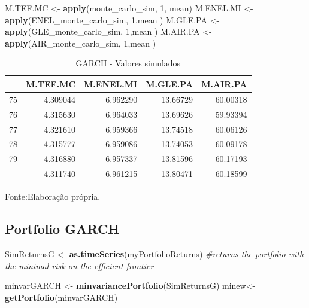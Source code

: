 \documentclass[
  12pt,
  a4paper,
  openany]{book}
\newenvironment{Shaded}{\begin{snugshade}}{\end{snugshade}}
\newcommand{\CommentTok}[1]{\textcolor[rgb]{0.56,0.35,0.01}{\textit{#1}}}
\newcommand{\DecValTok}[1]{\textcolor[rgb]{0.00,0.00,0.81}{#1}}
\newcommand{\KeywordTok}[1]{\textcolor[rgb]{0.13,0.29,0.53}{\textbf{#1}}}
\newcommand{\NormalTok}[1]{#1}
\newcommand{\StringTok}[1]{\textcolor[rgb]{0.31,0.60,0.02}{#1}}
\begin{document}
\scriptsize

\begin{Shaded}
\begin{Highlighting}[]
\NormalTok{M.TEF.MC \textless{}{-}}\StringTok{ }\KeywordTok{apply}\NormalTok{(monte\_carlo\_sim, }\DecValTok{1}\NormalTok{, mean)}
\NormalTok{M.ENEL.MI \textless{}{-}}\StringTok{ }\KeywordTok{apply}\NormalTok{(ENEL\_monte\_carlo\_sim, }\DecValTok{1}\NormalTok{,mean )}
\NormalTok{M.GLE.PA \textless{}{-}}\StringTok{ }\KeywordTok{apply}\NormalTok{(GLE\_monte\_carlo\_sim, }\DecValTok{1}\NormalTok{,mean )}
\NormalTok{M.AIR.PA \textless{}{-}}\StringTok{ }\KeywordTok{apply}\NormalTok{(AIR\_monte\_carlo\_sim, }\DecValTok{1}\NormalTok{,mean )}
\end{Highlighting}
\end{Shaded}

\normalsize
\begin{table}[!h]

\caption{\label{tab:unnamed-chunk-41}GARCH - Valores simulados}
\centering
\begin{tabular}[t]{lrrrr}
\toprule
  & M.TEF.MC & M.ENEL.MI & M.GLE.PA & M.AIR.PA\\
\midrule
75 & 4.309044 & 6.962290 & 13.66729 & 60.00318\\
76 & 4.315630 & 6.964033 & 13.69626 & 59.93394\\
77 & 4.321610 & 6.959366 & 13.74518 & 60.06126\\
78 & 4.315777 & 6.959086 & 13.74053 & 60.09178\\
79 & 4.316880 & 6.957337 & 13.81596 & 60.17193\\
\addlinespace
80 & 4.311740 & 6.961215 & 13.80471 & 60.18599\\
\bottomrule
\end{tabular}
\end{table}
\FloatBarrier
\centering

Fonte:Elaboração própria.

\justifying
\bigskip

\hypertarget{portfolio-garch}{%
\subsection{Portfolio GARCH}\label{portfolio-garch}}

\scriptsize

\begin{Shaded}
\begin{Highlighting}[]
\NormalTok{SimReturnsG \textless{}{-}}\StringTok{ }\KeywordTok{as.timeSeries}\NormalTok{(myPortfolioReturns)}
\CommentTok{\#returns the portfolio with the minimal risk on the efficient frontier}

\NormalTok{minvarGARCH \textless{}{-}}\StringTok{ }\KeywordTok{minvariancePortfolio}\NormalTok{(SimReturnsG) }
\NormalTok{minew\textless{}{-}}\KeywordTok{getPortfolio}\NormalTok{(minvarGARCH)}
\end{Highlighting}
\end{Shaded}
\end{document}

